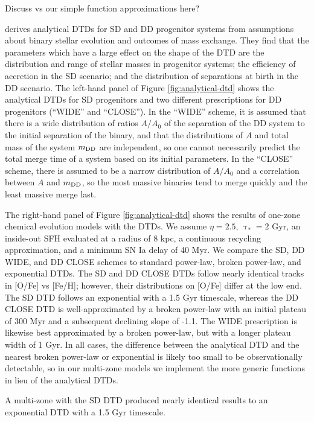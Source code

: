 \documentclass[twocolumn,twocolappendix,linenumbers,trackchanges]{aastex631}
\begin{document}
Discuss \citet{Greggio2005-AnalyticalRates} vs our simple function approximations here?

\citet{Greggio2005-AnalyticalRates} derives analytical DTDs for SD and DD progenitor systems from assumptions about binary stellar evolution and outcomes of mass exchange. They find that the parameters which have a large effect on the shape of the DTD are the distribution and range of stellar masses in progenitor systems; the efficiency of accretion in the SD scenario; and the distribution of separations at birth in the DD scenario. The left-hand panel of Figure \ref{fig:analytical-dtd} shows the analytical DTDs for SD progenitors and two different prescriptions for DD progenitors (``WIDE'' and ``CLOSE''). In the ``WIDE'' scheme, it is assumed that there is a wide distribution of ratios $A/A_0$ of the separation of the DD system to the initial separation of the binary, and that the distributions of $A$ and total mass of the system $m_{\rm DD}$ are independent, so one cannot necessarily predict the total merge time of a system based on its initial parameters. In the ``CLOSE'' scheme, there is assumed to be a narrow distribution of $A/A_0$ and a correlation between $A$ and $m_{\rm DD}$, so the most massive binaries tend to merge quickly and the least massive merge last.

The right-hand panel of Figure \ref{fig:analytical-dtd} shows the results of one-zone chemical evolution models with the \citet{Greggio2005-AnalyticalRates} DTDs. We assume $\eta=2.5$, $\uptau_*=2$ Gyr, an inside-out SFH evaluated at a radius of 8 kpc, a continuous recycling approximation, and a minimum SN Ia delay of 40 Myr. We compare the SD, DD WIDE, and DD CLOSE schemes to standard power-law, broken power-law, and exponential DTDs. The SD and DD CLOSE DTDs follow nearly identical tracks in [O/Fe] vs [Fe/H]; however, their distributions on [O/Fe] differ at the low end. The SD DTD follows an exponential with a 1.5 Gyr timescale, whereas the DD CLOSE DTD is well-approximated by a broken power-law with an initial plateau of 300 Myr and a subsequent declining slope of -1.1. The WIDE prescription is likewise best approximated by a broken power-law, but with a longer plateau width of 1 Gyr. In all cases, the difference between the analytical DTD and the nearest broken power-law or exponential is likely too small to be observationally detectable, so in our multi-zone models we implement the more generic functions in lieu of the analytical DTDs.

A multi-zone with the \citet{Greggio2005-AnalyticalRates} SD DTD produced nearly identical results to an exponential DTD with a 1.5 Gyr timescale.
\end{document}
